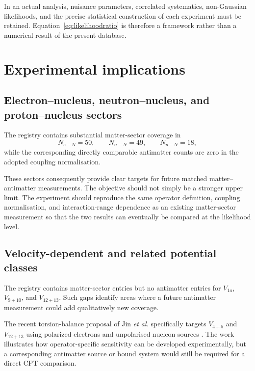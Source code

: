 \documentclass[aps,prd,reprint,superscriptaddress,nofootinbib]{revtex4-2}
\begin{document}
	In an actual analysis, nuisance parameters, correlated systematics,
	non-Gaussian likelihoods, and the precise statistical construction of
	each experiment must be retained. Equation~\eqref{eq:likelihoodratio}
	is therefore a framework rather than a numerical result of the present
	database.
	
	\section{Experimental implications}
	
	\subsection{Electron--nucleus, neutron--nucleus, and proton--nucleus
		sectors}
	
	The registry contains substantial matter-sector coverage in
	\begin{equation}
		N_{e-N}=50,
		\qquad
		N_{n-N}=49,
		\qquad
		N_{p-N}=18,
	\end{equation}
	while the corresponding directly comparable antimatter counts are
	zero in the adopted coupling normalisation.
	
	These sectors consequently provide clear targets for future matched
	matter--antimatter measurements. The objective should not simply be a
	stronger upper limit. The experiment should reproduce the same
	operator definition, coupling normalisation, and interaction-range
	dependence as an existing matter-sector measurement so that the two
	results can eventually be compared at the likelihood level.
	
	\subsection{Velocity-dependent and related potential classes}
	
	The registry contains matter-sector entries but no antimatter entries
	for $V_{1a}$, $V_{9+10}$, and $V_{12+13}$. Such gaps identify areas
	where a future antimatter measurement could add qualitatively new
	coverage.
	
	The recent torsion-balance proposal of Jin \textit{et al.} specifically targets $V_{4+5}$ and $V_{12+13}$ using polarized electrons and
	unpolarised nucleon sources \cite{Jin2026}. The work illustrates how
	operator-specific sensitivity can be developed experimentally, but a
	corresponding antimatter source or bound system would still be required
	for a direct CPT comparison.
	
\end{document}
